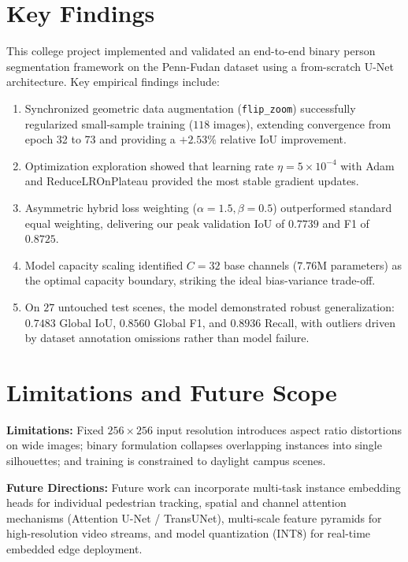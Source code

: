 \documentclass[10pt,a4paper]{report}
\begin{document}
\section{Key Findings}
This college project implemented and validated an end-to-end binary person segmentation framework on the Penn-Fudan dataset using a from-scratch U-Net architecture. Key empirical findings include:
\begin{enumerate}
    \item Synchronized geometric data augmentation (\texttt{flip\_zoom}) successfully regularized small-sample training ($118$ images), extending convergence from epoch 32 to 73 and providing a $+2.53\%$ relative IoU improvement.
    \item Optimization exploration showed that learning rate $\eta = 5\times 10^{-4}$ with Adam and ReduceLROnPlateau provided the most stable gradient updates.
    \item Asymmetric hybrid loss weighting ($\alpha=1.5, \beta=0.5$) outperformed standard equal weighting, delivering our peak validation IoU of $\mathbf{0.7739}$ and F1 of $\mathbf{0.8725}$.
    \item Model capacity scaling identified $C=32$ base channels ($7.76$M parameters) as the optimal capacity boundary, striking the ideal bias-variance trade-off.
    \item On $27$ untouched test scenes, the model demonstrated robust generalization: $\mathbf{0.7483}$ Global IoU, $\mathbf{0.8560}$ Global F1, and $\mathbf{0.8936}$ Recall, with outliers driven by dataset annotation omissions rather than model failure.
\end{enumerate}

\section{Limitations and Future Scope}
\textbf{Limitations:} Fixed $256 \times 256$ input resolution introduces aspect ratio distortions on wide images; binary formulation collapses overlapping instances into single silhouettes; and training is constrained to daylight campus scenes.

\noindent\textbf{Future Directions:} Future work can incorporate multi-task instance embedding heads for individual pedestrian tracking, spatial and channel attention mechanisms (Attention U-Net / TransUNet), multi-scale feature pyramids for high-resolution video streams, and model quantization (INT8) for real-time embedded edge deployment.
\end{document}
